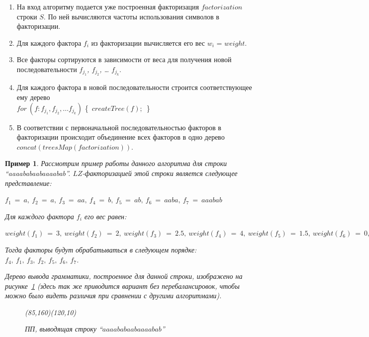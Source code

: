 \documentclass[12pt,a4paper]{extarticle}
\theoremstyle{break}
\newtheorem{example}{Пример}
\begin{document}
\begin{enumerate}
  \item На вход алгоритму подается уже построенная факторизация
  $factorization$ строки $S$. По ней вычисляются частоты использования символов в факторизации. 
  \item Для каждого фактора \emph{$f_{i}$} из факторизации  вычисляется его вес
  \emph{$w_{i}$} = $weight$.
  \item Все факторы сортируются в зависимости от веса для получения новой
  последовательности \emph{$f_{j_1}$, $f_{j_2}$, \ldots
  $f_{j_k}$}.
  \item Для каждого фактора в новой последовательности строится соответствующее
  ему дерево
  \\$for\ (f : f_{j_1}, f_{j_2}, \ldots f_{j_k})$
  	\{\ $createTree(f);$\ \}
  \item В соответствии с первоначальной последовательностью факторов в
  факторизации происходит объединение всех факторов в одно дерево 
  $concat(treesMap(factorization))$.
\end{enumerate}

\begin{example}
Рассмотрим пример работы данного алгоритма для строки ``aaaababaabaaaabab''.
$LZ$-факторизацией этой строки является следующее представление:
\begin{center}
$f_1\ =\ a,\ f_2\ =\ a,\ f_3\ =\ aa,\ f_4\ =\ b,\ f_5\ =\ ab,\ f_6\ =\ aaba,\
f_7\ =\ aaabab$
\end{center}
Для каждого фактора $f_i$ его вес равен:
\begin{center}
$weight(f_1)\ =\ 3,\ weight(f_2)\ =\ 2,\ weight(f_3)\ =\ 2.5,\ weight(f_4)\ =\
4,\ weight(f_5)\ =\ 1.5,\ weight(f_6)\ =\ 0,\ weight(f_7)\ =\ 0$
\end{center}
Тогда факторы будут обрабатываться в следующем порядке: $f_4,\ f_1,\
f_3,\ f_2,\ f_5,\ f_6,\ f_7$.

Дерево вывода грамматики, построенное для данной строки, изображено на
рисунке~\ref{lazycslp} (здесь так же приводится вариант без перебалансировок,
чтобы можно было видеть различия при сравнении с другими алгоритмами).

\begin{figure}[!h]
    \begin{center}
        \begin{picture}(85,160)(120,10)
            \picLazyClassic
        \end{picture}
    \end{center}
    \caption{ПП, выводящая строку ``$aaaababaabaaaabab$''}
    \label{lazycslp}
\end{figure}

\end{example}
\end{document}
